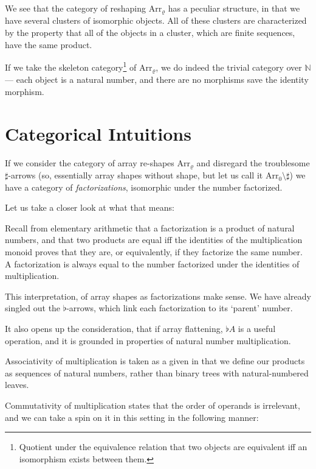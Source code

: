 \documentclass{DIKU-report-variant}
\newcommand\mrm[1]{\mathrm{#1}}
\newcommand\brm[1]{\bm{\mrm{#1}}}
\newcommand\Nat{\mathbb{N}}
\newcommand\Arr[1]{{\brm{Arr}_{\brm{#1}}}}
\begin{document}
We see that the category of reshaping \(\Arr\varrho\) has a peculiar structure,
in that we have several clusters of isomorphic objects. All of these clusters are characterized by the property
that all of the objects in a cluster, which are finite sequences, have the same product.

If we take the skeleton category\footnote{Quotient under the equivalence relation that
two objects are equivalent iff an isomorphism exists between them.} of \(\Arr\varrho\), we do indeed
the trivial category over \(\Nat\) --- each object is a natural number, and there are no morphisms
save the identity morphism.

\section{Categorical Intuitions}

If we consider the category of array re-shapes \(\Arr\varrho\) and disregard the troublesome
\(\sharp\)-arrows (so, essentially array shapes without shape, but let us call it \(\Arr0\setminus\sharp\))
we have a category of \emph{factorizations}, isomorphic under the number factorized.

Let us take a closer look at what that means: 

Recall from elementary arithmetic that a factorization is a product of
natural numbers, and that two products are equal iff the identities of
the multiplication monoid proves that they are, or equivalently,
if they factorize the same number. A factorization is always equal to
the number factorized under the identities of multiplication.

This interpretation, of array shapes as factorizations make sense. We have
already singled out the \(\flat\)-arrows, which link each factorization to
its `parent' number.

It also opens up the consideration, that if array flattening, \(\flat A\) is
a useful operation, and it is grounded in properties of natural number multiplication.

Associativity of multiplication is taken as a given in that we define our
products as sequences of natural numbers, rather than binary trees with natural-numbered
leaves.

Commutativity of multiplication states that the order of operands is irrelevant,
and we can take a spin on it in this setting in the following manner:
\end{document}

